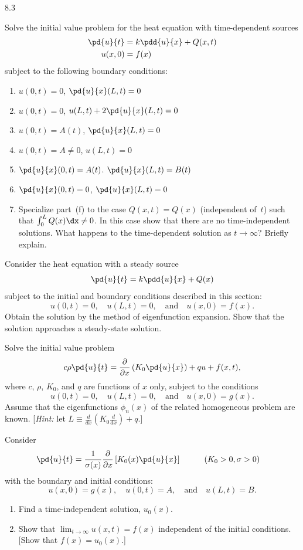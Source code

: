 \begin{exercises}{8.3}

\item Solve the initial value problem for the heat equation with time-dependent sources
\begin{align*}
\pd{u}{t} &= k\pdd{u}{x} + Q(x,t) \\
u(x,0) &= f(x)
\end{align*}
subject to the following boundary conditions:
\begin{enumerate}
\item[(a)] $u(0,t) = 0$, \quad $\pd{u}{x}(L,t) = 0$
\item[(b)] $u(0,t) = 0$, \quad $u(L,t) + 2\pd{u}{x}(L,t) = 0$
\item[\starred(c)] $u(0,t) = A(t)$, \quad $\pd{u}{x}(L,t) = 0$
\item[(d)] $u(0,t) = A\neq 0$, \quad $u(L,t) = 0$
\item[(e)] $\pd{u}{x}(0,t) = A(t)$. \quad $\pd{u}{x}(L,t) = B(t)$
\item[\starred(f)] $\pd{u}{x}(0,t) = 0$, \quad $\pd{u}{x}(L,t) = 0$
\item[(g)] Specialize part~(f) to the case $Q(x,t) = Q(x)$ (independent of~$t$) such that $\int_0^L Q(x)\dx \neq 0$.  In this case show that there are no time-independent solutions.  What happens to the time-dependent solution as $t\to\infty$?  Briefly explain.
\end{enumerate}

\item Consider the heat equation with a steady source
\[
\pd{u}{t} = k\pdd{u}{x} + Q(x)
\]
subject to the initial and boundary conditions described in this section:
\[
u(0,t) = 0,\quad u(L,t) = 0,\quad\text{and}\quad u(x,0) = f(x).
\]
Obtain the solution by the method of eigenfunction expansion.  Show that the solution approaches a steady-state solution.

\item[\starred 8.3.3.] Solve the initial value problem
\[
c\rho\pd{u}{t} = \frac{\partial}{\partial x}\left(K_0\pd{u}{x}\right) + qu + f(x,t),
\]
where $c$, $\rho$, $K_0$, and $q$ are functions of $x$ only, subject to the conditions
\[
u(0,t) = 0,\quad u(L,t) = 0,\quad\text{and}\quad u(x,0) = g(x).
\]
Assume that the eigenfunctions $\phi_n(x)$ of the related homogeneous problem are known.  [\textit{Hint:} let $L \equiv \frac{d}{d x}\left(K_0\frac{d}{d x}\right) + q$.]

\item Consider
\begin{alignat*}{2}
\pd{u}{t} &= \frac{1}{\sigma(x)}\frac{\partial}{\partial x}\left[K_0(x)\pd{u}{x}\right] &\qquad (K_0 &> 0, \sigma > 0)
\end{alignat*}
with the boundary and initial conditions:
\[
u(x,0) = g(x),\quad u(0,t) = A,\quad\text{and}\quad u(L,t) = B.
\]
\begin{enumerate}
\item[\starred(a)] Find a time-independent solution, $u_0(x)$.
\item[(b)] Show that $\lim_{t\to\infty} u(x,t) = f(x)$ independent of the initial conditions.  [Show that $f(x) = u_0(x)$.]
\end{enumerate}


\end{exercises}
